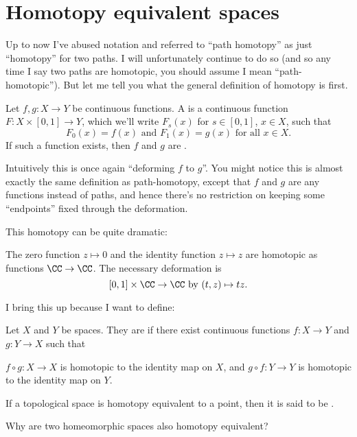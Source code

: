 \section{Homotopy equivalent spaces}
Up to now I've abused notation and referred to ``path homotopy'' as just ``homotopy'' for two paths.
I will unfortunately continue to do so (and so any time I say two paths are homotopic, you should assume I mean ``path-homotopic'').
But let me tell you what the general definition of homotopy is first.
\begin{definition}
	Let $f,g \colon X \to Y$ be continuous functions.
	A  is a continuous function $F \colon X \times [0,1] \to Y$,
	which we'll write $F_s(x)$ for $s \in [0,1]$, $x \in X$, such that
	\[ F_0(x) = f(x) \text{ and } F_1(x) = g(x) \text{ for all $x \in X$.} \]
	If such a function exists, then $f$ and $g$ are .
\end{definition}
Intuitively this is once again ``deforming $f$ to $g$''.
You might notice this is almost exactly the same definition as path-homotopy,
except that $f$ and $g$ are any functions instead of paths, and hence
there's no restriction on keeping some ``endpoints'' fixed through the deformation.

This homotopy can be quite dramatic:
\begin{example}
	The zero function $z \mapsto 0$ and the identity function $z \mapsto z$
	are homotopic as functions $\CC \to \CC$.
	The necessary deformation is
	\[ [0,1] \times \CC \to \CC \text{ by } (t,z) \mapsto tz. \]
\end{example}

I bring this up because I want to define:
\begin{definition}
	\label{def:homotopy_equiv}
	Let $X$ and $Y$ be spaces.
	They are  if there exist
	continuous functions $f \colon X \to Y$ and $g \colon Y \to X$ such that
	\begin{enumerate}[(i)]
		\ii $f \circ g \colon X \to X$ is homotopic to the identity map on $X$, and
		\ii $g \circ f \colon Y \to Y$ is homotopic to the identity map on $Y$.
	\end{enumerate}
	If a topological space is homotopy equivalent to a point,
	then it is said to be .
\end{definition}
\begin{ques}
	Why are two homeomorphic spaces also homotopy equivalent?
\end{ques}


